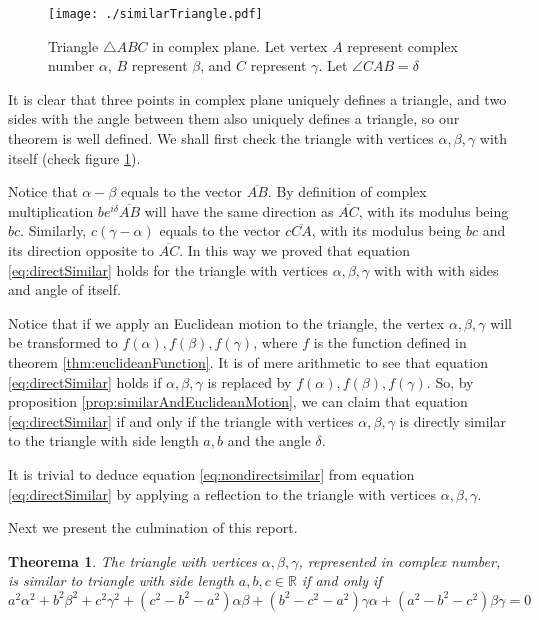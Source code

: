 \documentclass[12pt, a4paper]{article}
\newtheorem{theorem}{Theorema}[section]
\theoremstyle{definition}
\theoremstyle{remark}
\newcommand{\bb}[1]{\mathbb{#1}}
\begin{document}
\begin{figure}[htbp]
	\centering
	\texttt{[image: ./similarTriangle.pdf]}
	\caption{Triangle $\triangle ABC$ in complex plane. Let vertex $A$ represent complex number $\alpha$, $B$ represent $\beta$, and $C$ represent $\gamma$. Let $\angle CAB = \delta$}
	\label{fig:TriangleABC}
\end{figure}

It is clear that three points in complex plane uniquely defines a triangle, and two sides with the angle between them also uniquely defines a triangle, so our theorem is well defined.
We shall first check the triangle with vertices $\alpha, \beta, \gamma$ with itself (check figure \ref{fig:TriangleABC}).

Notice that $\alpha - \beta$ equals to the vector $\overline{AB}$. By definition of complex multiplication $be^{i \delta} \overline{AB} $  will have the same direction as $\overline{AC}$, with its modulus being $bc$.
Similarly, $c(\gamma - \alpha)$ equals to the vector $c\overline{CA}$, with its modulus being $bc$ and its direction opposite to $\overline{AC}$. 
In this way we proved that equation \ref{eq:directSimilar} holds for the triangle with vertices $\alpha, \beta, \gamma$ with with with sides and angle of itself.

Notice that if we apply an Euclidean motion to the triangle, the vertex $\alpha, \beta, \gamma$ will be transformed to $f(\alpha), f(\beta), f(\gamma)$, where $f$ is the function defined in theorem \ref{thm:euclideanFunction}. 
It is of mere arithmetic to see that equation \ref{eq:directSimilar} holds if $\alpha, \beta, \gamma$ is replaced by $f(\alpha), f(\beta), f(\gamma)$. So, by proposition \ref{prop:similarAndEuclideanMotion}, we can claim that equation \ref{eq:directSimilar} if and only if the triangle with vertices $\alpha, \beta, \gamma$ is directly similar to the triangle with side length $a, b$ and the angle $\delta$.

It is trivial to deduce equation \ref{eq:nondirectsimilar} from equation \ref{eq:directSimilar} by applying a reflection to the triangle with vertices $\alpha, \beta, \gamma$.

Next we present the culmination of this report.

\begin{theorem}\label{thm:similarity}
	The triangle with vertices $\alpha, \beta, \gamma$, represented in complex number, is similar to triangle with side length $a, b,c \in \bb{R}$ if and only if 
	\begin{equation}\label{eq:similarity}
		a^2 \alpha^2 + b^2 \beta^2 + c^2 \gamma^2 + (c^2-b^2-a^2)\alpha \beta + (b^2-c^2-a^2)\gamma \alpha + (a^2 - b^2 - c^2) \beta \gamma = 0
	\end{equation}
\end{theorem}
\end{document}
